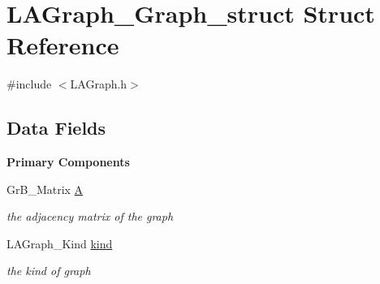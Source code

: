 \hypertarget{structLAGraph__Graph__struct}{}\section{L\+A\+Graph\+\_\+\+Graph\+\_\+struct Struct Reference}
\label{structLAGraph__Graph__struct}


{\ttfamily \#include $<$L\+A\+Graph.\+h$>$}

\subsection*{Data Fields}
\begin{Indent}\textbf{ Primary Components}\par
\begin{DoxyCompactItemize}
\item 
\mbox{\label{structLAGraph__Graph__struct_a5cea03ee2e21fd0bb09e58a7743f7d52}} 
Gr\+B\+\_\+\+Matrix \hyperlink{structLAGraph__Graph__struct_a5cea03ee2e21fd0bb09e58a7743f7d52}{A}
\begin{DoxyCompactList}\small\item\em the adjacency matrix of the graph \end{DoxyCompactList}\item 
\mbox{\label{structLAGraph__Graph__struct_a04886ec19a68599c3a89b94c4d422fed}} 
L\+A\+Graph\+\_\+\+Kind \hyperlink{structLAGraph__Graph__struct_a04886ec19a68599c3a89b94c4d422fed}{kind}
\begin{DoxyCompactList}\small\item\em the kind of graph \end{DoxyCompactList}\end{DoxyCompactItemize}
\end{Indent}
